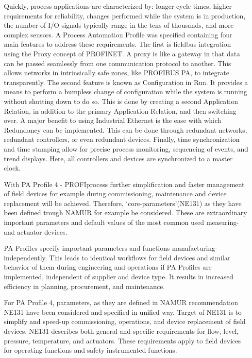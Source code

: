 \documentclass[conference]{IEEEtran}
\begin{document}
Quickly, process applications are characterized by: longer cycle times, higher  requirements for reliability, changes performed while the system is in production, the number  of I/O signals typically range in the tens of thousands, and more complex sensors. A Process  Automation Profile was specified containing four main features to address these requirements.  The first is fieldbus integration using the Proxy concept of PROFINET. A proxy is like a gateway  in that data can be passed seamlessly from one communication protocol to another. This  allows networks in intrinsically safe zones, like PROFIBUS PA, to integrate transparently. The  second feature is known as Configuration in Run. It provides a means to perform a bumpless change  of configuration while the system is running without shutting down to do so. This is done  by creating a second Application Relation, in addition to the primary Application Relation,  and then switching over. A major benefit to using Industrial Ethernet is the ease with  which Redundancy can be implemented. This can be done through redundant networks, redundant  controllers, or even redundant devices. Finally, time synchronization and time stamping allow for  precise process monitoring, sequencing of events, and trend displays. Here, all controllers and  devices are synchronized to a master clock.

With PA Profile 4 - PROFIprocess further simplification and faster management of field devices for example during commissioning, maintenance and device replacement will be achieved. Therefore, ‘core-parameters’(NE131) as they have been defined trough NAMUR for example be considered. These are extraordinary important parameters and default values of the most common used measuring- and actuator devices. 

PA Profiles specify important parameters and functions manufacturing-independently. This leads to identical workflows for field devices and similar behavior of them during engineering and operations if PA Profiles are implemented, independent of supplier and device type. It results in increased efficiency in planning, procurement, and maintenance.


For PA Profile 4, parameters, as they are defined in NAMUR recommendation NE131 have been considered and specified in unified way. 
Target of NE131 is to simplify and speed-up commissioning, operations, and device replacement of field devices. 
NE131 describes both general and specific requirements for flow, level, pressure, temperature, and actuators. These requirements apply to field devices for operating functions and safety instrumented functions.
\end{document}
